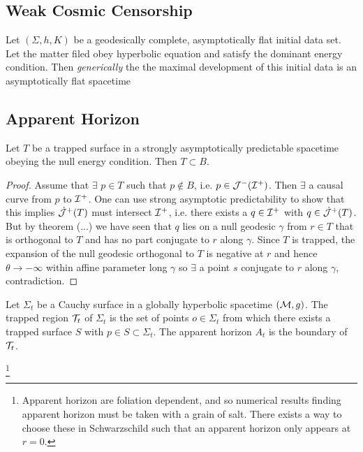 \documentclass{article}
\begin{document}
\subsection{Weak Cosmic Censorship}

\begin{conjecture}
Let $(\Sigma,h,K)$ be a geodesically complete, asymptotically flat initial data set. Let the matter filed obey hyperbolic equation and satisfy the dominant energy condition. Then \emph{generically} the the maximal development of this initial data is an asymptotically flat spacetime
\end{conjecture}

\subsection{Apparent Horizon}

\begin{theorem}
Let $T$ be a trapped surface in a strongly asymptotically predictable spacetime obeying the null energy condition. Then $T\subset B$. 
\end{theorem}
\begin{proof}
Assume that $\exists$ $p \in T$ such that $p \not\in B$, i.e. $p\in\mathcal{J}^-(\mathcal{I}^+)$. Then $\exists$  a causal curve from $p$ to $\mathcal{I}^+$. One can use strong asymptotic predictability to show that this implies $\dot{\mathcal{J}}^+(T)$ must intersect $\mathcal{I}^+$, i.e. there exists a $q \in \mathcal{I}^+$ with $q \in \dot{\mathcal{J}}^+(T)$. But by theorem (...) we have seen that $q$ lies on a null geodesic $\gamma$ from $r\in T$ that is orthogonal to $T$ and has no part conjugate to $r$ along $\gamma$. Since $T$ is trapped, the expansion of the null geodesic orthogonal to $T$ is negative at $r$ and hence $\theta \to - \infty$ within affine parameter long $\gamma$ so $\exists$ a point $s$ conjugate to $r$ along $\gamma$, contradiction. 
\end{proof}

\begin{definition}
Let $\Sigma_t$ be a Cauchy surface in a globally hyperbolic spacetime $(\mathcal{M},g)$. The trapped region $\mathcal{T}_t$ of $\Sigma_t$ is the set of points $o\in\Sigma_t$ from which there exists a trapped surface $S$ with $p\in S\subset\Sigma_t$. The apparent horizon $A_t$ is the boundary of $\mathcal{T}_t$. 
\end{definition}
\footnote{Apparent horizon are foliation dependent, and so numerical results finding apparent horizon must be taken with a grain of salt. There exists a way to choose these in Schwarzschild such that an apparent horizon only appears at $r=0$. }
\end{document}
